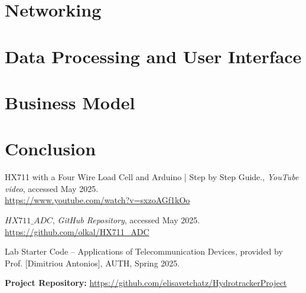 \documentclass{article}
\begin{document}
\section{Networking}


\section{Data Processing and User Interface}


\section{Business Model}


\section{Conclusion}


\begin{thebibliography}{9}

HX711 with a Four Wire Load Cell and Arduino | Step by Step Guide., 
\textit{YouTube video}, accessed May 2025. \\
\url{https://www.youtube.com/watch?v=sxzoAGf1kOo}

$HX711\_ADC$, 
\textit{GitHub Repository}, accessed May 2025. \\
\url{https://github.com/olkal/HX711_ADC}

Lab Starter Code – Applications of Telecommunication Devices, 
provided by Prof. [Dimitriou Antonios], AUTH, Spring 2025.


\end{thebibliography}
\textbf{Project Repository:} \url{https://github.com/elisavetchatz/HydrotrackerProject}
\end{document}
